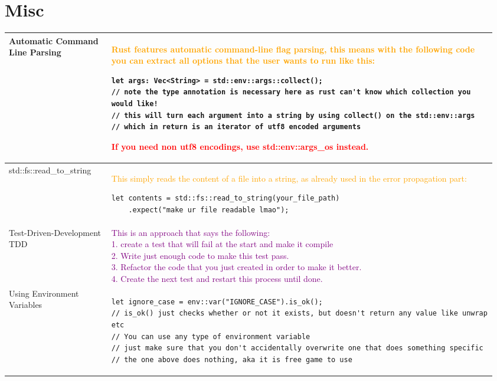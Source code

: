 \documentclass[main.tex,fontsize=8pt,paper=a4,paper=portrait,DIV=calc,]{scrartcl}
\begin{document}
\begin{table}[ht!]
\section{Misc}
\begin{tabular}{|m{0.2\linewidth}|m{0.755\linewidth}|}
\hline
Automatic Command Line Parsing & 
\textcolor{orange}{Rust features automatic command-line flag parsing, this means with the following code you can extract all options that the user wants to run like this:}\newline
\begin{lstlisting}
let args: Vec<String> = std::env::args::collect();
// note the type annotation is necessary here as rust can't know which collection you would like!
// this will turn each argument into a string by using collect() on the std::env::args 
// which in return is an iterator of utf8 encoded arguments
\end{lstlisting}
\textcolor{red}{If you need non utf8 encodings, use \textbf{std::env::args\_os} instead.}\\
\hline
std::fs::read\_to\_string & 
\textcolor{orange}{This simply reads the content of a file into a string, as already used in the error propagation part:}\newline
\begin{lstlisting}
let contents = std::fs::read_to_string(your_file_path) 
    .expect("make ur file readable lmao");
\end{lstlisting}\\
\hline
Test-Driven-Development TDD & 
\textcolor{purple}{This is an approach that says the following:\newline
\large 1. create a test that will fail at the  start and make it compile\newline
2. Write just enough code to make this test pass.\newline 
3. Refactor the code that you just created in order to make it better.\newline
4. Create the next test and restart this process until done.}\\
\hline
Using Environment Variables & 
\begin{lstlisting}
let ignore_case = env::var("IGNORE_CASE").is_ok();
// is_ok() just checks whether or not it exists, but doesn't return any value like unwrap etc 
// You can use any type of environment variable
// just make sure that you don't accidentally overwrite one that does something specific
// the one above does nothing, aka it is free game to use 
\end{lstlisting}\\

\end{tabular}
\end{table}
\end{document}
